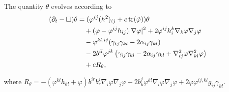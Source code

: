 \documentclass{amsart}
\begin{document}
\begin{lemma}
\label{lem:Evtheta}
The quantity $\theta$ evolves according to
\[
\begin{split}
(\partial_{t} - \Box)\theta &= (\varphi^{ij}(h^2)_{ij} + c\operatorname{tr}(\dot{\varphi}))\theta \\
&\quad + (\varphi - \varphi^{ij}h_{ij})|\nabla\varphi|^{2} + 2\varphi^{ij}h^{k}_{i}\nabla_k\varphi\nabla_j\varphi \\
&\quad - \varphi^{kl,ij} (\gamma_{ij}\gamma_{kl}  - 2\alpha_{ij} \gamma_{kl}) \\
&\quad - 2b^{il} \varphi^{jk} \left(\gamma_{ij} \gamma_{kl} - 2\alpha_{ij} \gamma_{kl} + \nabla^2_{ij}\varphi\nabla^2_{kl}\varphi\right) \\
&\quad + cR_{\theta},
\end{split}
\]
\end{lemma}
where
$
R_{\theta} = -(\varphi^{kl}h_{kl} + \varphi)b^{ir}b^{j}_{r}\nabla_i \varphi\nabla_j\varphi + 2 b^{j}_{k}\varphi^{kl}\nabla_l\varphi\nabla_j\varphi + 2 \varphi\varphi^{ij,kl} g_{ij} \gamma_{kl}.
$
\end{document}
